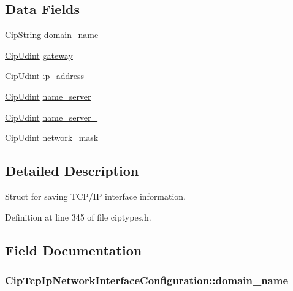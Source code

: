 \subsection*{\-Data \-Fields}
\begin{DoxyCompactItemize}
\item 
\hyperlink{structCipString}{\-Cip\-String} \hyperlink{structCipTcpIpNetworkInterfaceConfiguration_a873c0c29956214d7fc4b73f57ba19181}{domain\-\_\-name}
\item 
\hyperlink{typedefs_8h_aa6230aff6a173bcb6dc949ac85c2e7f1}{\-Cip\-Udint} \hyperlink{structCipTcpIpNetworkInterfaceConfiguration_a57d4e982c2b983e2b776316105a4b3a9}{gateway}
\item 
\hyperlink{typedefs_8h_aa6230aff6a173bcb6dc949ac85c2e7f1}{\-Cip\-Udint} \hyperlink{structCipTcpIpNetworkInterfaceConfiguration_a2c56d6d4982484316a97630d7f1a4c95}{ip\-\_\-address}
\item 
\hyperlink{typedefs_8h_aa6230aff6a173bcb6dc949ac85c2e7f1}{\-Cip\-Udint} \hyperlink{structCipTcpIpNetworkInterfaceConfiguration_a82ed2612d25c04a1191b1d3582999584}{name\-\_\-server}
\item 
\hyperlink{typedefs_8h_aa6230aff6a173bcb6dc949ac85c2e7f1}{\-Cip\-Udint} \hyperlink{structCipTcpIpNetworkInterfaceConfiguration_afa8efb882cb0a0bf9e752fe78bb1efb7}{name\-\_\-server\-\_}
\item 
\hyperlink{typedefs_8h_aa6230aff6a173bcb6dc949ac85c2e7f1}{\-Cip\-Udint} \hyperlink{structCipTcpIpNetworkInterfaceConfiguration_a4bcb9a46ca3377b29cc13a80e6597a72}{network\-\_\-mask}
\end{DoxyCompactItemize}


\subsection{\-Detailed \-Description}
\-Struct for saving \-T\-C\-P/\-I\-P interface information. 

\-Definition at line 345 of file ciptypes.\-h.



\subsection{\-Field \-Documentation}
\hypertarget{structCipTcpIpNetworkInterfaceConfiguration_a873c0c29956214d7fc4b73f57ba19181}{
\subsubsection[{domain\-\_\-name}]{ {\bf \-Cip\-Tcp\-Ip\-Network\-Interface\-Configuration\-::domain\-\_\-name}}}\label{d0/d4c/structCipTcpIpNetworkInterfaceConfiguration_a873c0c29956214d7fc4b73f57ba19181}


